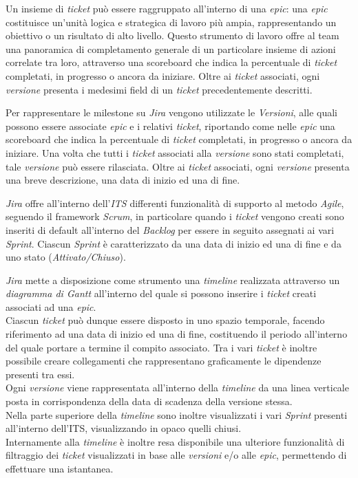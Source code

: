 \documentclass[10pt, a4paper]{article}
\begin{document}
Un insieme di \textit{ticket} può essere raggruppato all'interno di una \textit{epic}: una \textit{epic} costituisce un'unità 
logica e strategica di lavoro più ampia, rappresentando un obiettivo o un risultato di alto livello. Questo strumento di lavoro offre
al team una panoramica di completamento generale di un particolare insieme di azioni correlate tra loro, attraverso una 
scoreboard che indica la percentuale di \textit{ticket} completati, in progresso o ancora da iniziare.
Oltre ai \textit{ticket} associati, ogni \textit{versione} presenta i medesimi field di un \textit{ticket} precedentemente descritti.

Per rappresentare le milestone su \textit{Jira} vengono utilizzate le \textit{Versioni}, alle quali possono essere associate \textit{epic}
e i relativi \textit{ticket}, riportando come nelle \textit{epic} una scoreboard che indica la percentuale di \textit{ticket} completati, in progresso o ancora da iniziare.
Una volta che tutti i \textit{ticket} associati alla \textit{versione} sono stati completati, tale \textit{versione} può essere rilasciata.
Oltre ai \textit{ticket} associati, ogni \textit{versione} presenta una breve descrizione, una data di inizio ed una di fine.

\textit{Jira} offre all'interno dell'\textit{ITS} differenti funzionalità di supporto al metodo \textit{Agile\pg}, seguendo il framework \textit{Scrum\pg}, in particolare
quando i \textit{ticket} vengono creati sono inseriti di default all'interno del \textit{Backlog} per essere in seguito
assegnati ai vari \textit{Sprint}. 
Ciascun \textit{Sprint} è caratterizzato da una data di inizio ed una di fine e da uno stato (\textit{Attivato/Chiuso}).

\textit{Jira} mette a disposizione come strumento una \textit{timeline} realizzata attraverso un \textit{diagramma di Gantt\pg} all'interno del quale si possono inserire i \textit{ticket}
creati associati ad una \textit{epic}.\\
Ciascun \textit{ticket} può dunque essere disposto in uno spazio temporale, facendo riferimento ad una data di inizio ed una di fine, costituendo il periodo
all'interno del quale portare a termine il compito associato. Tra i vari \textit{ticket} è inoltre possibile creare collegamenti che rappresentano graficamente 
le dipendenze presenti tra essi.\\
Ogni \textit{versione} viene rappresentata all'interno della \textit{timeline} da una linea verticale posta in corrispondenza della data di scadenza
della versione stessa.\\
Nella parte superiore della \textit{timeline} sono inoltre visualizzati i vari \textit{Sprint} presenti all'interno dell'ITS, visualizzando in opaco quelli chiusi.\\
Internamente alla \textit{timeline} è inoltre resa disponibile una ulteriore funzionalità di filtraggio dei \textit{ticket} visualizzati in base alle \textit{versioni} e/o alle \textit{epic},
permettendo di effettuare una istantanea.
\end{document}
